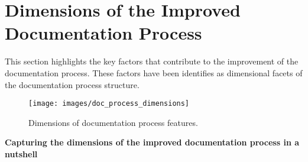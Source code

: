 \section{Dimensions of the Improved Documentation Process} \label{PorcDimension}
\indent This section highlights the key factors that contribute to the improvement of the documentation process. These factors have been identifies as dimensional facets of the documentation process structure. 
\begin{figure}[H]
  \centering
  \texttt{[image: images/doc\_process\_dimensions]}
  \caption[Dimensions of documentation process features]{Dimensions of documentation process features.}\label{fig:doc_process_dimensions}
\end{figure}
\textbf{Capturing the dimensions of the improved documentation process in a nutshell} 

